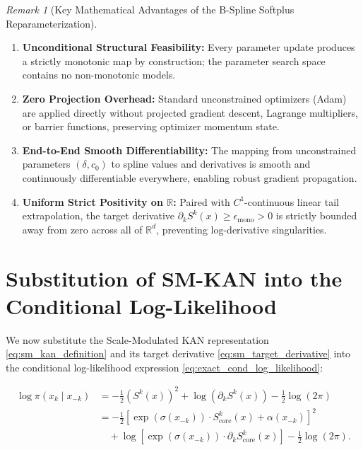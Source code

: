 \documentclass[11pt,a4paper]{article}
\theoremstyle{plain}
\theoremstyle{definition}
\theoremstyle{remark}
\newtheorem{remark}[theorem]{Remark}
\begin{document}
\begin{remark}[Key Mathematical Advantages of the B-Spline Softplus Reparameterization]
\begin{enumerate}
    \item \textbf{Unconditional Structural Feasibility:} Every parameter update produces a strictly monotonic map by construction; the parameter search space contains no non-monotonic models.
    \item \textbf{Zero Projection Overhead:} Standard unconstrained optimizers (Adam) are applied directly without projected gradient descent, Lagrange multipliers, or barrier functions, preserving optimizer momentum state.
    \item \textbf{End-to-End Smooth Differentiability:} The mapping from unconstrained parameters $(\delta, c_0)$ to spline values and derivatives is smooth and continuously differentiable everywhere, enabling robust gradient propagation.
    \item \textbf{Uniform Strict Positivity on $\mathbb{R}$:} Paired with $C^1$-continuous linear tail extrapolation, the target derivative $\partial_k S^k(x) \ge \epsilon_{\text{mono}} > 0$ is strictly bounded away from zero across all of $\mathbb{R}^d$, preventing log-derivative singularities.
\end{enumerate}
\end{remark}

\section{Substitution of SM-KAN into the Conditional Log-Likelihood}

We now substitute the Scale-Modulated KAN representation \eqref{eq:sm_kan_definition} and its target derivative \eqref{eq:sm_target_derivative} into the conditional log-likelihood expression \eqref{eq:exact_cond_log_likelihood}:

\begin{align}
    \log \pi(x_k \mid x_{-k}) &= -\frac{1}{2}\left( S^k(x) \right)^2 + \log \left( \partial_k S^k(x) \right) - \frac{1}{2}\log(2\pi) \nonumber \\
    &= -\frac{1}{2}\left[ \exp\left(\sigma(x_{-k})\right) \cdot S^k_{\text{core}}(x) + \alpha(x_{-k}) \right]^2 \nonumber \\
    &\quad + \log \left[ \exp\left(\sigma(x_{-k})\right) \cdot \partial_k S^k_{\text{core}}(x) \right] - \frac{1}{2}\log(2\pi).
\end{align}
\end{document}
